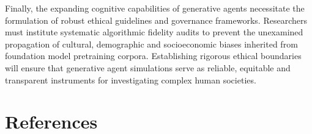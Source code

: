 \documentclass[12pt,a4paper]{report}
\begin{document}
Finally, the expanding cognitive capabilities of generative agents necessitate the formulation of robust ethical guidelines and governance frameworks. Researchers must institute systematic algorithmic fidelity audits to prevent the unexamined propagation of cultural, demographic and socioeconomic biases inherited from foundation model pretraining corpora. Establishing rigorous ethical boundaries will ensure that generative agent simulations serve as reliable, equitable and transparent instruments for investigating complex human societies.


\chapter*{References}
\label{chap:references}
\end{document}
